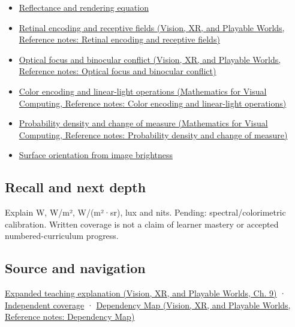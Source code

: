 \begin{itemize}
\tightlist
\item
  \hyperref[appendix-96da0b153b77]{Reflectance and rendering equation}
\item
  \href{../07-Vision-XR-and-Playable-Worlds/main.pdf\#nameddest=appendix-7281c15ac44a}{Retinal encoding and receptive fields (Vision, XR, and Playable Worlds, Reference notes: Retinal encoding and receptive fields)}
\item
  \href{../07-Vision-XR-and-Playable-Worlds/main.pdf\#nameddest=appendix-f90cee1be7a4}{Optical focus and binocular conflict (Vision, XR, and Playable Worlds, Reference notes: Optical focus and binocular conflict)}
\item
  \href{../02-Mathematics-for-Visual-Computing/main.pdf\#nameddest=appendix-a9f83ad40792}{Color encoding and linear-light operations (Mathematics for Visual Computing, Reference notes: Color encoding and linear-light operations)}
\item
  \href{../02-Mathematics-for-Visual-Computing/main.pdf\#nameddest=appendix-4815cd87ab8b}{Probability density and change of measure (Mathematics for Visual Computing, Reference notes: Probability density and change of measure)}
\item
  \hyperref[appendix-89b2d5b7c9e1]{Surface orientation from image brightness}
\end{itemize}

\subsection{Recall and next depth}\label{appendix-215c2570199b-recall-and-next-depth}

\hypertarget{appendix-215c2570199b-recall-and-next-depth}{}

Explain W, W/m², W/(m²·sr), lux and nits. Pending: spectral/colorimetric calibration. Written coverage is not a claim of learner mastery or accepted numbered-curriculum progress.

\subsection{Source and navigation}\label{appendix-215c2570199b-source-and-navigation}

\hypertarget{appendix-215c2570199b-source-and-navigation}{}

\href{../07-Vision-XR-and-Playable-Worlds/main.pdf\#nameddest=04-visual-computing-ii-ch042-light-must-become-a-quantity-before-it-becomes-a-color}{Expanded teaching explanation (Vision, XR, and Playable Worlds, Ch. 9)} · \hyperref[appendix-fd090d982a15-xr01---independent-seeing-and-representation-source]{Independent coverage} · \href{../07-Vision-XR-and-Playable-Worlds/main.pdf\#nameddest=appendix-4ad47bdd269a}{Dependency Map (Vision, XR, and Playable Worlds, Reference notes: Dependency Map)}

